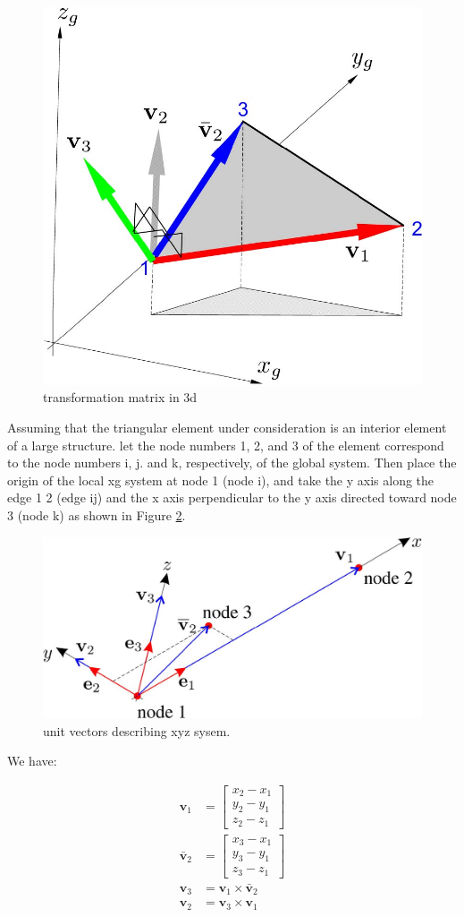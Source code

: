 \begin{figure}[h!]
	\centering
	\includegraphics[width=0.5\linewidth]{figures/transformation_matrix}
	\caption{transformation matrix in 3d}
	\label{fig:transformationmatrix}
\end{figure}

Assuming that the triangular element under consideration is an interior element of a large structure. let the node numbers 1, 2, and 3 of the element correspond to the node numbers i, j. and
k, respectively, of the global system. Then place the origin of the local xg system at node 1 (node i), and take the y axis along the edge 1 2 (edge ij) and the x axis perpendicular
to the y axis directed toward node 3 (node k) as shown in Figure \ref{fig: unit vectors for transformation}.

\begin{figure}[h!]
\centering
\includegraphics[width=0.5\linewidth]{figures/unit_vectors_for_transformation}
\caption{unit vectors describing xyz sysem.}
\label{fig: unit vectors for transformation}
\end{figure}

We have:

\begin{align*}
	\mathbf{v}_1 &= \begin{bmatrix}
		x_2-x_1 \\ 
		y_2-y_1 \\ 
		z_2-z_1
		\end{bmatrix} \\
		 \bar{\mathbf{v}}_2 &= \begin{bmatrix}
		x_3-x_1 \\ 
		y_3-y_1 \\ 
		z_3-z_1 
	\end{bmatrix} \\
	 \mathbf{v}_3 &= \mathbf{v}_1 \times \bar{\mathbf{v}}_2 \\
	 \mathbf{v}_2 &= \mathbf{v}_3 \times \mathbf{v}_1
\end{align*}

